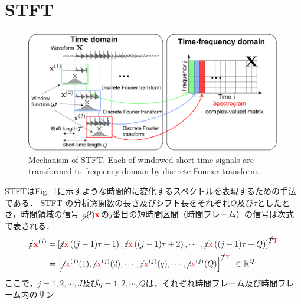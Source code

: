 \section{STFT}
\label{sec:stft}
\begin{figure}[t]
    \begin{center}
        \includegraphics[width=0.95\columnwidth]{figures/stft.pdf}
    \end{center}
    \vspace{-8pt}
	\caption{Mechanism of STFT. Each of windowed short-time signals are transformed to frequency domain by discrete Fourier transform.}
	\label{fig:stft}
\end{figure}
STFTはFig.~\ref{fig:stft}に示すような時間的に変化するスペクトルを表現するための手法である．
STFT の分析窓関数の長さ及びシフト長をそれぞれ$Q$及び$\tau$としたとき，時間領域の信号
$\cancel{z(l)} \textcolor{red}{\mathbf{x}}$の$j$番目の短時間区間（時間フレーム）の信号は次式で表される．
\begin{align}
    \bm{\cancel{z} \textcolor{red}{\mathbf{x}}}^{(j)} &= \left[\cancel{z} \textcolor{red}{\mathrm{x}}\left((j-1)\tau+1\right), \cancel{z} \textcolor{red}{\mathrm{x}}\left((j-1)\tau+2\right), \cdots , \cancel{z} \textcolor{red}{\mathrm{x}}\left((j-1)\tau+Q\right) \right]^{\cancel{T} \textcolor{red}{\mathrm{T}}}\\
    &= \left[
    \cancel{z} \textcolor{red}{\mathrm{x}}^{(j)}(1),\cancel{z} \textcolor{red}{\mathrm{x}}^{(j)}(2),\cdots , \cancel{z} \textcolor{red}{\mathrm{x}}^{(j)}(q), \cdots , \cancel{z} \textcolor{red}{\mathrm{x}}^{(j)}(Q)
    \right]^{\cancel{T} \textcolor{red}{\mathrm{T}}}~\in \mathbb{R}^{Q}
\end{align}
ここで，$j= 1, 2, \cdots , J$及び$q= 1, 2, \cdots , Q$は，それぞれ時間フレーム及び時間フレーム内のサン
